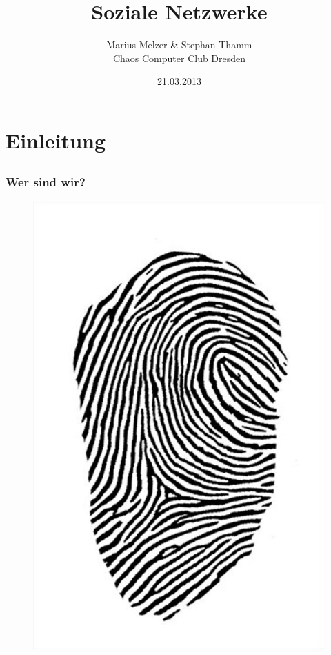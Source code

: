 \documentclass[12pt]{beamer}
\title{Soziale Netzwerke}
\author{\small Marius Melzer \& Stephan Thamm\\\large Chaos Computer Club Dresden}
\date{21.03.2013}
\begin{document}
\maketitle

\section{Einleitung}
\subsection{}

\begin{frame}
  \frametitle{Wer sind wir?}
  \begin{figure}
    \includegraphics[height=0.7\textheight]{img/fingerabdruck.jpg}
  \end{figure}
\end{frame}
\end{document}
